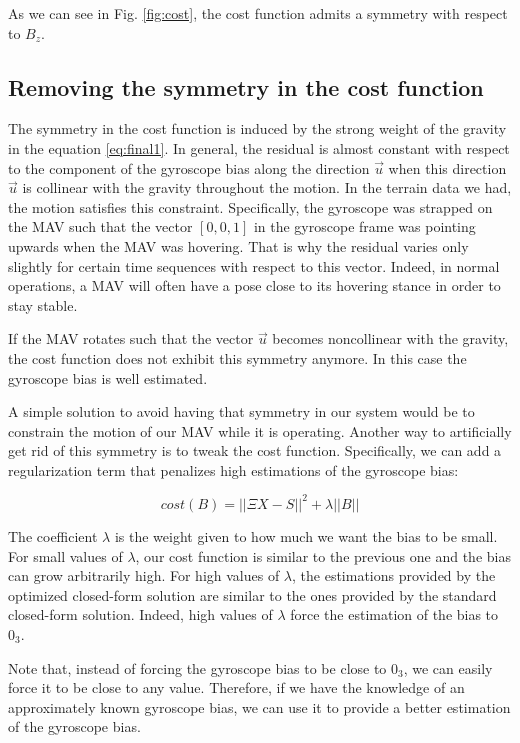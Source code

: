 \documentclass[letterpaper, 10 pt, conference]{ieeeconf}  %
\begin{document}
As we can see in Fig. \ref{fig:cost}, the cost function admits a symmetry with respect to $B_z$.

\subsection{Removing the symmetry in the cost function}

The symmetry in the cost function is induced by the strong weight of the gravity in the equation \ref{eq:final1}.
In general, the residual is almost constant with respect to the component of the gyroscope bias along the direction $\vec{u}$ when this direction $\vec{u}$ is collinear with the gravity throughout the motion.
In the terrain data we had, the motion satisfies this constraint.
Specifically, the gyroscope was strapped on the MAV such that the vector $[0,0,1]$ in the gyroscope frame was pointing upwards when the MAV was hovering.
That is why the residual varies only slightly for certain time sequences with respect to this vector.
Indeed, in normal operations, a MAV will often have a pose close to its hovering stance in order to stay stable.

If the MAV rotates such that the vector $\vec{u}$ becomes noncollinear with the gravity, the cost function does not exhibit this symmetry anymore.
In this case the gyroscope bias is well estimated.

A simple solution to avoid having that symmetry in our system would be to constrain the motion of our MAV while it is operating.
Another way to artificially get rid of this symmetry is to tweak the cost function.
Specifically, we can add a regularization term that penalizes high estimations of the gyroscope bias:

\begin{equation}
cost(B) = ||\Xi X - S||^2 + \lambda ||B||
\end{equation}

The coefficient $\lambda$ is the weight given to how much we want the bias to be small.
For small values of $\lambda$, our cost function is similar to the previous one and the bias can grow arbitrarily high.
For high values of $\lambda$, the estimations provided by the optimized closed-form solution are similar to the ones provided by the standard closed-form solution.
Indeed, high values of $\lambda$ force the estimation of the bias to $0_3$.

Note that, instead of forcing the gyroscope bias to be close to $0_3$, we can easily force it to be close to any value.
Therefore, if we have the knowledge of an approximately known gyroscope bias, we can use it to provide a better estimation of the gyroscope bias.
\end{document}
